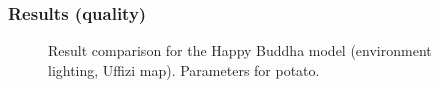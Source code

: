 \documentclass{beamer}
\begin{document}
\begin{frame}
    \frametitle{Results (quality)}
				\begin{figure}
\centering
{}
\vspace{-0.1cm}
\caption{Result comparison for the Happy Buddha model (environment lighting, Uffizi map). Parameters for potato.}
\end{figure}
\end{frame}
\end{document}
